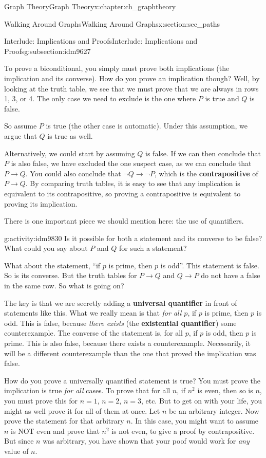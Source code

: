\documentclass[oneside,10pt,]{book}
\newcommand{\terminology}[1]{\textbf{#1}}
\numberwithin{equation}{chapter}
\def\imp{\rightarrow}
\begin{document}
\begin{chapterptx}{Graph Theory}{}{Graph Theory}{}{}{x:chapter:ch_graphtheory}
\begin{sectionptx}{Walking Around Graphs}{}{Walking Around Graphs}{}{}{x:section:sec_paths}
\begin{subsectionptx}{Interlude: Implications and Proofs}{}{Interlude: Implications and Proofs}{}{}{g:subsection:idm9627}
\par
To prove a biconditional, you simply must prove both implications (the implication and its converse).  How do you prove an implication though?  Well, by looking at the truth table, we see that we must prove that we are always in rows 1, 3, or 4.  The only case we need to exclude is the one where \(P\) is true and \(Q\) is false.%
\par
So assume \(P\) is true (the other case is automatic).  Under this assumption, we argue that \(Q\) is true as well.%
\par
Alternatively, we could start by assuming \(Q\) is false.  If we can then conclude that \(P\) is also false, we have excluded the one suspect case, as we can conclude that \(P \imp Q\).  You could also conclude that \(\neg Q \imp \neg P\), which is the \terminology{contrapositive} of \(P \imp Q\).  By comparing truth tables, it is easy to see that any implication is equivalent to its contrapositive, so proving a contrapositive is equivalent to proving its implication.%
\par
There is one important piece we should mention here: the use of quantifiers.%
\begin{activity}{}{g:activity:idm9830}%
Is it possible for both a statement and its converse to be false?  What could you say about \(P\) and \(Q\) for such a statement?%
\end{activity}
What about the statement, ``if \(p\) is prime, then \(p\) is odd''.  This statement is false.  So is its converse.  But the truth tables for \(P \imp Q\) and \(Q \imp P\) do not have a false in the same row.  So what is going on?%
\par
The key is that we are secretly adding a \terminology{universal quantifier} in front of statements like this.  What we really mean is that \emph{for all \(p\)}, if \(p\) is prime, then \(p\) is odd.  This is false, because \emph{there exists} (the \terminology{existential quantifier}) some counterexample.  The converse of the statement is, for all \(p\), if \(p\) is odd, then \(p\) is prime.  This is also false, because there exists a counterexample.  Necessarily, it will be a different counterexample than the one that proved the implication was false.%
\par
How do you prove a universally quantified statement is true?  You must prove the implication is true \emph{for all} cases.  To prove that for all \(n\), if \(n^2\) is even, then so is \(n\), you must prove this for \(n = 1\), \(n = 2\), \(n =3\), etc.  But to get on with your life, you might as well prove it for all of them at once.  Let \(n\) be an arbitrary integer.  Now prove the statement for that arbitrary \(n\).  In this case, you might want to assume \(n\) is NOT even and prove that \(n^2\) is not even, to give a proof by contrapositive.  But since \(n\) was arbitrary, you have shown that your poof would work for \emph{any} value of \(n\).%

\end{subsectionptx}
\end{sectionptx}
\end{chapterptx}
\end{document}
